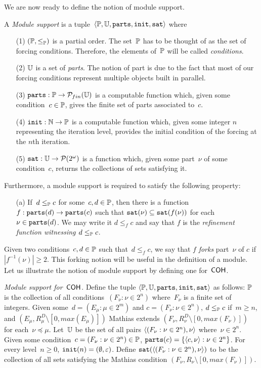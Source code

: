 We are now ready to define the notion of module support. 

\begin{definition}
A \emph{Module support} is a tuple~$\left\langle \mathbb{P}, \mathbb{U}, \mathtt{parts}, \mathtt{init}, \mathtt{sat} \right\rangle$ where
\begin{itemize}
	\item[(1)] $(\mathbb{P}, \leq_{\mathbb{P}})$ is a partial order. The set~$\mathbb{P}$ has to be thought of as the set of forcing conditions.
	Therefore, the elements of~$\mathbb{P}$ will be called \emph{conditions}.
	\item[(2)] $\mathbb{U}$ is a set of \emph{parts}. 
	The notion of part is due to the fact that most of our forcing conditions represent multiple
	objects built in parallel.
	\item[(3)] $\mathtt{parts} : \mathbb{P} \to \mathcal{P}_{fin}(\mathbb{U})$ is a computable function which, given some condition~$c \in \mathbb{P}$,
	gives the finite set of parts associated to~$c$.
	\item[(4)] $\mathtt{init} : \mathbb{N} \to \mathbb{P}$ is a computable function which, given some integer $n$ representing
	the iteration level, provides the initial condition of the forcing at the $n$th iteration.
	\item[(5)] $\mathtt{sat} : \mathbb{U} \to \mathcal{P}(2^\omega)$ is a function which, given some part~$\nu$ of some condition~$c$,
	returns the collections of sets satisfying it.
\end{itemize}
Furthermore, a module support is required to satisfy the following property:
\begin{itemize}
	\item[(a)] If~$d \leq_{\mathbb{P}} c$ for some~$c, d \in \mathbb{P}$, then there is a function~$f : \mathtt{parts}(d) \to \mathtt{parts}(c)$
such that $\mathtt{sat}(\nu) \subseteq \mathtt{sat}(f(\nu))$ for each~$\nu \in \mathtt{parts}(d)$. We may write it $d \leq_f c$
	and say that $f$ is the \emph{refinement function witnessing $d \leq_{\mathbb{P}} c$}.
\end{itemize}
\end{definition}

Given two conditions~$c, d \in \mathbb{P}$ such that~$d \leq_f c$, 
we say that $f$ \emph{forks} part~$\nu$ of $c$ if $|f^{-1}(\nu)| \geq 2$. 
This forking notion will be useful in the definition of a module.
Let us illustrate the notion of module support by defining one for~$\operatorname{\sf{COH}}$.
\smallskip

\emph{Module support for~$\operatorname{\sf{COH}}$}.
Define the tuple  $\left\langle \mathbb{P}, \mathbb{U}, \mathtt{parts}, \mathtt{init}, \mathtt{sat} \right\rangle$ as follows:
$\mathbb{P}$ is the collection of all conditions~$(F_\nu : \nu \in 2^n)$ where~$F_\nu$ is a finite set of integers.
Given some~$d = (E_\mu : \mu \in 2^m)$ and $c = (F_\nu : \nu \in 2^n)$, $d \leq_{\mathbb{P}} c$ if~$m \geq n$,
and $(E_\mu, R^D_\mu \setminus [0, max(E_\mu)])$ Mathias extends 
$(F_\nu, R^D_\nu \setminus [0, max(F_\nu)])$ for each~$\nu \preceq \mu$.
Let~$\mathbb{U}$ be the set of all pairs $\left\langle (F_\nu : \nu \in 2^n), \nu \right\rangle$ where~$\nu \in 2^n$.
Given some condition~$c = (F_\nu : \nu \in 2^n) \in \mathbb{P}$, $\mathtt{parts}(c) = \{\left\langle c, \nu \right\rangle : \nu \in 2^n\}$.
For every level~$n \geq 0$, $\mathtt{init}(n) = (\emptyset, \varepsilon)$.
Define $\mathtt{sat}(\left\langle (F_\nu : \nu \in 2^n), \nu \right\rangle)$ to be the collection of all sets satisfying the Mathias condition
$(F_\nu, R_\nu \setminus [0, max(F_\nu)])$.

